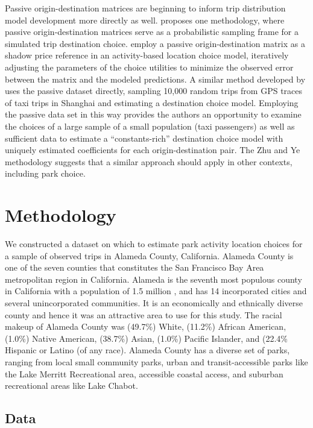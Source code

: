 \documentclass[]{elsarticle} %
\begin{document}
Passive origin-destination matrices are beginning to inform trip distribution
model development more directly as well. \citet{tf_idea} proposes one methodology,
where passive origin-destination matrices serve as a probabilistic sampling
frame for a simulated trip destination choice. \citet{Bernardin2018} employ a passive
origin-destination matrix as a shadow price reference in an activity-based
location choice model, iteratively adjusting the parameters of the choice
utilities to minimize the observed error between the matrix and the modeled
predictions. A similar method developed by \citet{Zhu2018} uses the passive dataset
directly, sampling 10,000 random trips from GPS traces of taxi trips in Shanghai
and estimating a destination choice model. Employing the passive data set in
this way provides the authors an opportunity to examine the choices of a
large sample of a small population (taxi passengers) as well as sufficient data
to estimate a ``constants-rich'' destination choice model with uniquely estimated
coefficients for each origin-destination pair. The Zhu and Ye methodology
suggests that a similar approach should apply in other contexts, including park
choice.

\hypertarget{methodology}{%
\section{Methodology}\label{methodology}}

We constructed a dataset on which to estimate park activity location choices for
a sample of observed trips in Alameda County, California. Alameda County is one
of the seven counties that constitutes the San Francisco Bay Area metropolitan
region in California. Alameda is the seventh most populous county in California
with a population of 1.5 million \citep{alamedafacts}, and has 14 incorporated cities
and several unincorporated communities. It is an economically and ethnically
diverse county and hence it was an attractive area to use for this study. The
racial makeup of Alameda County was (49.7\%) White, (11.2\%) African American,
(1.0\%) Native American, (38.7\%) Asian, (1.0\%) Pacific Islander, and (22.4\%
Hispanic or Latino (of any race). Alameda County has a diverse set of parks,
ranging from local small community parks, urban and transit-accessible parks
like the Lake Merritt Recreational area, accessible coastal access, and suburban
recreational areas like Lake Chabot.

\hypertarget{data}{%
\subsection{Data}\label{data}}
\end{document}
